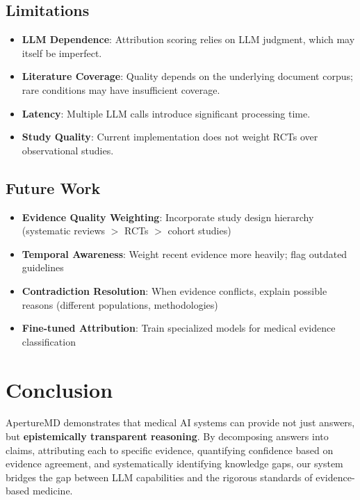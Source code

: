 \documentclass[11pt,a4paper]{article}
\begin{document}
\subsection{Limitations}

\begin{itemize}
    \item \textbf{LLM Dependence}: Attribution scoring relies on LLM judgment, which may itself be imperfect.
    
    \item \textbf{Literature Coverage}: Quality depends on the underlying document corpus; rare conditions may have insufficient coverage.
    
    \item \textbf{Latency}: Multiple LLM calls introduce significant processing time.
    
    \item \textbf{Study Quality}: Current implementation does not weight RCTs over observational studies.
\end{itemize}

\subsection{Future Work}

\begin{itemize}
    \item \textbf{Evidence Quality Weighting}: Incorporate study design hierarchy (systematic reviews $>$ RCTs $>$ cohort studies)
    
    \item \textbf{Temporal Awareness}: Weight recent evidence more heavily; flag outdated guidelines
    
    \item \textbf{Contradiction Resolution}: When evidence conflicts, explain possible reasons (different populations, methodologies)
    
    \item \textbf{Fine-tuned Attribution}: Train specialized models for medical evidence classification
\end{itemize}

\section{Conclusion}

ApertureMD demonstrates that medical AI systems can provide not just answers, but \textbf{epistemically transparent reasoning}. By decomposing answers into claims, attributing each to specific evidence, quantifying confidence based on evidence agreement, and systematically identifying knowledge gaps, our system bridges the gap between LLM capabilities and the rigorous standards of evidence-based medicine.
\end{document}
